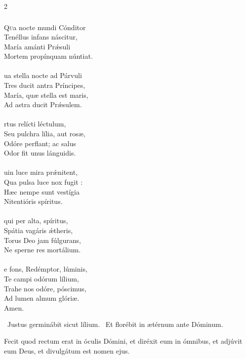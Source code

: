 \documentclass[9pt,twoside]{extarticle}
\begin{document}
\begin{multicols}{2}
{{\subsubsection*{\center {}}
\begin{center}\end{center}
\lettrine{Q}ua nocte mundi Cónditor\\
Tenéllus infans náscitur,\\
María amánti Prǽsuli\\
Mortem propínquam núntiat.\\
\\
ua stella nocte ad Párvuli\\
Tres ducit antra Príncipes,\\
María, quæ stella est maris,\\
Ad astra ducit Prǽsulem.\\
\\
rtus relícti léctulum,\\
Seu pulchra lília, aut rosæ,\\
Odóre perflant; ac salus\\
Odor fit unus lánguidis.\\
\\
uin luce mira prǽnitent,\\
Qua pulsa luce nox fugit :\\
Hæc nempe sunt vestígia\\
Nitentióris spíritus.\\
\\
 qui per alta, spíritus,\\
Spátia vagáris ǽtheris,\\
Torus Deo jam fúlgurans,\\
Ne sperne res mortálium.\\
\\
e fons, Redémptor, lúminis,\\
Te campi odórum lílium,\\
Trahe nos odóre, póscimus,\\
Ad lumen almum glóriæ.\\
Amen.

\begin{tightlist}{}
\item {}~Justus germinábit sicut lílium. ~Et florébit in ætérnum ante Dóminum.
\item {} Fecit quod rectum erat in óculis Dómini, et diréxit eum in ómnibus, et adjúvit eum Deus, et divulgátum est nomen ejus.
\end{tightlist}

}}
\end{multicols}
\end{document}

